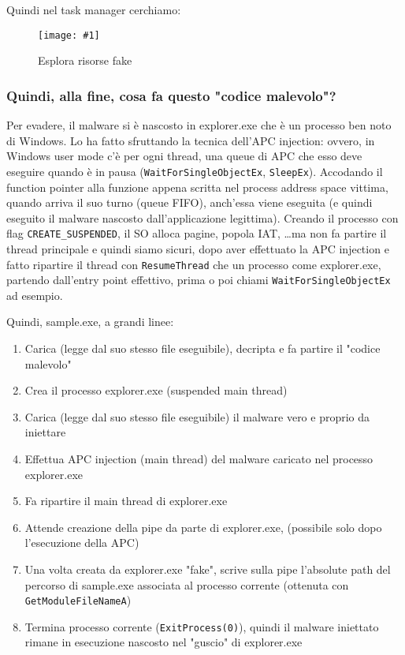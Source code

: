 \documentclass[
    a4paper, %
    11pt %
]{article}
\newcommand{\pic}[4]{\begin{figure}[H]
            \centering
            \texttt{[image: \#1]}
            \caption{#2}
            \label{fig:#1}
            \end{figure}}
\begin{document}
            Quindi nel task manager cerchiamo:

            \pic{explorer_fake}{Esplora risorse fake}{12cm}{5cm}

            \subsubsection{Quindi, alla fine, cosa fa questo "codice malevolo"?}
            Per evadere, il malware si è nascosto in explorer.exe che è un processo ben noto di Windows.
            Lo ha fatto sfruttando la tecnica dell'APC injection: ovvero, in Windows user mode c'è per ogni
            thread, una queue di APC che esso deve eseguire quando è in pausa 
            (\texttt{WaitForSingleObjectEx}, \texttt{SleepEx}). Accodando il function pointer alla funzione 
            appena scritta nel process address space vittima, quando arriva il suo turno (queue FIFO), anch'essa viene
            eseguita (e quindi eseguito il malware nascosto dall'applicazione legittima).
            Creando il processo con flag \texttt{CREATE\_SUSPENDED}, il SO alloca pagine, popola IAT, \dots ma non fa
            partire il thread principale e quindi siamo sicuri, dopo aver effettuato la APC injection e fatto
            ripartire il thread con \texttt{ResumeThread} che un processo come explorer.exe, partendo dall'entry 
            point effettivo, prima o poi chiami \texttt{WaitForSingleObjectEx} ad esempio.

            Quindi, sample.exe, a grandi linee:
            \begin{enumerate}
                \item Carica (legge dal suo stesso file eseguibile), decripta e fa partire il "codice malevolo"
                \item Crea il processo explorer.exe (suspended main thread)
                \item Carica (legge dal suo stesso file eseguibile) il malware vero e proprio da iniettare
                \item Effettua APC injection (main thread) del malware caricato nel processo explorer.exe
                \item Fa ripartire il main thread di explorer.exe
                \item Attende creazione della pipe da parte di explorer.exe, (possibile solo dopo l'esecuzione
                    della APC)
                \item Una volta creata da explorer.exe "fake", scrive sulla pipe l'absolute path del
                    percorso di sample.exe associata al processo corrente (ottenuta con \texttt{GetModuleFileNameA})
                \item Termina processo corrente (\texttt{ExitProcess(0)}), quindi il malware iniettato rimane in esecuzione nascosto 
                    nel "guscio" di explorer.exe
            \end{enumerate}
\end{document}

